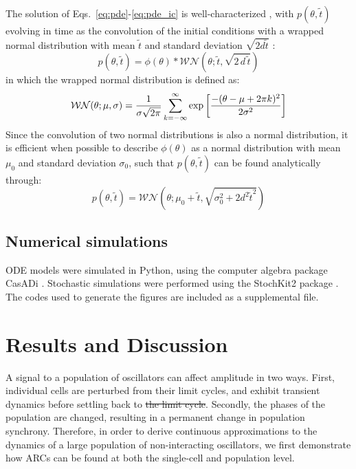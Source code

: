 \documentclass[11pt, letterpaper]{article}
\providecommand{\DIFadd}[1]{{\protect\color{blue}\uwave{#1}}} %
\providecommand{\DIFdel}[1]{{\protect\color{red}\sout{#1}}}                      %
\providecommand{\DIFaddbegin}{} %
\providecommand{\DIFaddend}{} %
\providecommand{\DIFdelbegin}{} %
\providecommand{\DIFdelend}{} %
\begin{document}
The solution of Eqs.~\ref{eq:pde}-\ref{eq:pde_ic} is well-characterized\DIFdelbegin %
\DIFdelend , with
$p(\theta, \tilde{t})$ evolving in time as the convolution of the initial
conditions with a wrapped normal distribution with mean $\tilde{t}$ and standard
deviation $\sqrt{2d\tilde{t}}$ \DIFaddbegin \cite{Chirikjian2009}\DIFaddend :
\begin{equation}
  p(\theta, \tilde{t}) = \phi(\theta) * \mathcal{WN}(\theta; \tilde{t},
  \sqrt{2\, d\, \tilde{t}})
\end{equation}
in which the wrapped normal distribution \cite{Mardia2009} is defined as:
\begin{equation}
  {\cal WN}(\theta; \mu, \sigma) =
  \frac{1}{\sigma\sqrt{2\pi}}\sum_{k=-\infty}^\infty \exp\left[\frac{-(\theta
  - \mu + 2\pi k)^2}{2\sigma^2}\right]
  \label{eq:wrapped_normal}
\end{equation}
Since the convolution of two normal distributions is also a normal distribution,
it is efficient when possible to describe $\phi(\theta)$ as a normal
distribution with mean $\mu_0$ and standard deviation $\sigma_0$, such that
$p(\theta, \tilde{t})$ can be found analytically through:
\begin{equation}
  p(\theta, \tilde{t}) = \mathcal{WN}(\theta; \mu_0 + \tilde{t},
  \sqrt{\sigma_0^2 + 2d^2\tilde{t}^2})
\end{equation}


\subsection*{Numerical simulations}

ODE models were simulated in Python, using the computer algebra package CasADi
\cite{Andersson2013b}. Stochastic simulations were performed using the StochKit2
package \cite{Sanft2011a}. The codes used to generate the figures are included
as a supplemental file.

\section*{Results and Discussion}

A signal to a population of \DIFaddbegin \DIFadd{limit cycle }\DIFaddend oscillators can affect amplitude in two
ways. First, individual cells are perturbed from their limit cycles, and exhibit
transient dynamics before settling back to \DIFdelbegin \DIFdel{the limit cycle}\DIFdelend \DIFaddbegin \DIFadd{steady state amplitudes}\DIFaddend . Secondly,
the phases of the population are changed, resulting in a permanent change in
population synchrony. Therefore, in order to derive continuous approximations to
the dynamics of a large population of non-interacting oscillators, we first
demonstrate how ARCs can be found at both the single-cell and population level.
\end{document}
